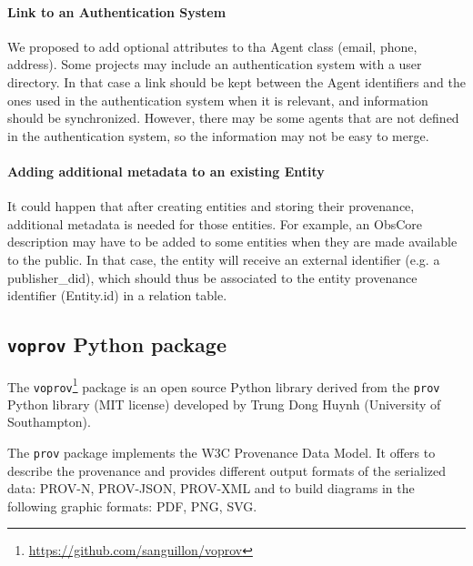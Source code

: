 \paragraph{Link to an Authentication System}
We proposed to add optional attributes to tha Agent class (email, phone, address). Some projects may include an authentication system with a user directory. In that case a link should be kept between the Agent identifiers and the ones used in the authentication system when it is relevant, and information should be synchronized. However, there may be some agents that are not defined in the authentication system, so the information may not be easy to merge.

\paragraph{Adding additional metadata to an existing Entity}
It could happen that after creating entities and storing their provenance, additional metadata is needed for those entities. For example, an ObsCore description may have to be added to some entities when they are made available to the public. In that case, the entity will receive an external identifier (e.g. a publisher\_did), which should thus be associated to the entity provenance identifier (Entity.id) in a relation table.

\subsection{\texttt{voprov} Python package}\label{sec:implementation_voprov}
The \texttt{voprov}\footnote{\url{https://github.com/sanguillon/voprov}} package is an open source Python library derived from the \texttt{prov} Python
library (MIT license) developed by Trung Dong Huynh (University of
Southampton). 

The \texttt{prov} package implements the W3C Provenance Data Model.  It offers to
describe the provenance and provides different output formats of the serialized data: PROV-N, PROV-JSON, PROV-XML and to build diagrams in the following graphic formats: PDF, PNG, SVG.

